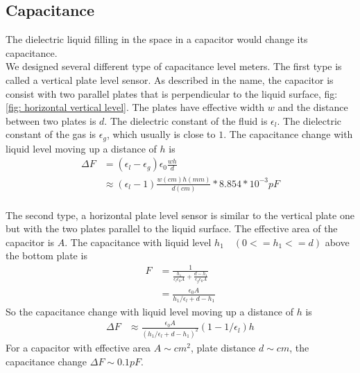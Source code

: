 \subsection{Capacitance }
The dielectric liquid filling in the space in a capacitor would change its capacitance. \\
We designed several different type of capacitance level meters. The first type is called a vertical plate level sensor. As described in the name, the capacitor is consist with two parallel plates that is perpendicular to the liquid surface, fig: \ref{fig: horizontal vertical level}. The plates have effective width $w$ and the distance between two plates is $d$. The dielectric constant of the fluid is $\epsilon_l$. The dielectric constant of the gas is $\epsilon_g$, which usually is close to $1$. The capacitance change with liquid level moving up a distance of $h$ is
\begin{align}
\Delta F & = (\epsilon_l-\epsilon_g)\epsilon_0 \frac{wh}{d} \\
& \approx (\epsilon_l-1) \frac{w(cm) h(mm)}{d(cm)} * 8.854*10^{-3} pF
\end{align}
\\
The second type, a horizontal plate level sensor is similar to the vertical plate one but with the two plates parallel to the liquid surface. The effective area of the capacitor is $A$. The capacitance with liquid level $h_1\quad(0 <= h_1 <=d)$ above the bottom plate is
\begin{align}
F & = \frac{1}{\frac{h_1}{\epsilon_l \epsilon_0 A} + \frac{d-h_1}{\epsilon_g \epsilon_0 A}} \\
& = \frac{\epsilon_0 A}{h_1/\epsilon_l +d - h_1} 
\end{align}
So the capacitance change with liquid level moving up a distance of $h$ is
\begin{align}
\Delta F & \approx \frac{\epsilon_0 A}{(h_1/\epsilon_l +d - h_1)^2}(1 - 1/\epsilon_l)h
\end{align}
For a capacitor with effective area $A \sim cm^2$, plate distance $d \sim cm$, the capacitance change $\Delta F \sim 0.1 pF$. 
\\
